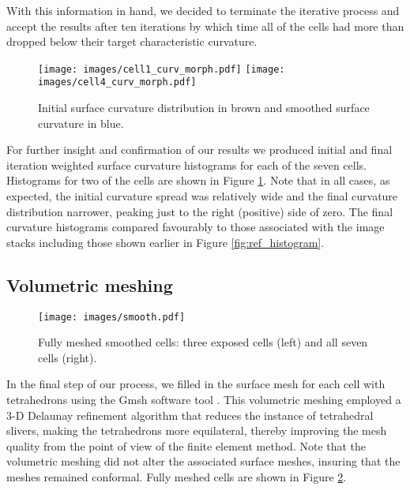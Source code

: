 \documentclass[a4paper,10pt]{article}
\begin{document}
With this information in hand, we decided to terminate the iterative process and accept the results after ten iterations by which time all of the cells had more than dropped below their target characteristic curvature.\\

\begin{figure}[H]
\begin{center}
\texttt{[image: images/cell1\_curv\_morph.pdf]}
\texttt{[image: images/cell4\_curv\_morph.pdf]}
\end{center}
\caption{Initial surface curvature distribution in brown and smoothed surface curvature in blue.}
\label{fig:morph_histogram}
\end{figure}

For further insight and confirmation of our results we produced initial and final iteration weighted surface curvature histograms for each of the seven cells. Histograms for two of the cells are shown in Figure \ref{fig:morph_histogram}. Note that in all cases, as expected, the initial curvature spread was relatively wide and the final curvature distribution narrower, peaking just to the right (positive) side of zero. The final curvature histograms compared favourably to those associated with the image stacks including those shown earlier in Figure \ref{fig:ref_histogram}.\\

\subsection{Volumetric meshing}

\begin{figure}[H]
\begin{center}
\texttt{[image: images/smooth.pdf]}
\end{center}
\caption{Fully meshed smoothed cells: three exposed cells (left) and all seven cells (right).}
\label{fig:smooth}
\end{figure}

In the final step of our process, we filled in the surface mesh for each cell with tetrahedrons using the Gmsh software tool \cite{NME:NME2579}. This volumetric meshing employed a 3-D Delaunay refinement algorithm that reduces the instance of tetrahedral slivers, making the tetrahedrons more equilateral, thereby improving the mesh quality from the point of view of the finite element method. Note that the volumetric meshing did not alter the associated surface meshes, insuring that the meshes remained conformal. Fully meshed cells are shown in Figure \ref{fig:smooth}.\\
\end{document}
